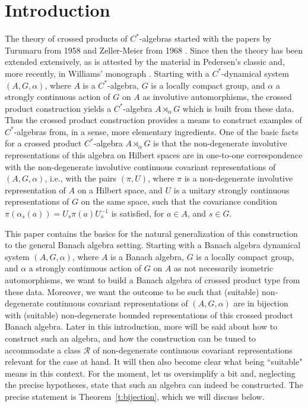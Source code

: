 \documentclass{amsart}
\theoremstyle{plain}
\theoremstyle{definition}
\numberwithin{equation}{section}
\begin{document}
\maketitle

\section{Introduction}\label{sec:intro}

The theory of crossed products of $C^*$-algebras started with the papers by Turumaru \cite{turumaru} from 1958 and Zeller-Meier from 1968 \cite{zeller-meier}. Since then the theory has been extended extensively, as is attested by the material in Pedersen's classic \cite{pedersen} and, more recently, in Williams' monograph \cite{williams}.
Starting with a $C^*$-dynamical system ${(A,G,\alpha)}$, where $A$ is a $C^*$-algebra, $G$ is a locally compact group, and $\alpha$ a strongly continuous action of $G$ on $A$ as involutive automorphisms, the crossed product construction yields a $C^*$-algebra $A{\rtimes}_\alpha G$ which is built from these data. Thus the crossed product construction provides a means to construct examples of $C^*$-algebras from, in a sense, more elementary ingredients.
One of the basic facts for a crossed product $C^*$-algebra $A{\rtimes}_\alpha G$ is that the non-degenerate involutive representations of this algebra on  Hilbert spaces are in one-to-one correspondence with the non-degenerate involutive continuous covariant representations of ${(A,G,\alpha)}$, i.e., with the pairs ${(\pi,U)}$, where $\pi$ is a non-degenerate involutive representation of $A$ on a Hilbert space, and $U$ is a unitary strongly continuous representations of $G$ on the same space, such that the covariance condition $\pi(\alpha_s(a))=U_s\pi(a)U_s^{-1}$ is satisfied, for $a\in A$, and $s\in G$.

This paper contains the basics for the natural generalization of this construction to the general Banach algebra setting. Starting with a Banach algebra dynamical system ${(A,G,\alpha)}$, where $A$ is a Banach algebra, $G$ is a locally compact group, and $\alpha$ a strongly continuous action of $G$ on $A$ as not necessarily isometric automorphisms, we want to build a Banach algebra of crossed product type from these data. Moreover, we want the outcome to be such that (suitable) non-degenerate continuous covariant representations of ${(A,G,\alpha)}$ are in bijection with (suitable) non-degenerate bounded representations of this crossed product Banach algebra. Later in this introduction, more will be said about how to construct such an algebra, and how the construction can be tuned to accommodate a class ${\mathcal R}$ of non-degenerate continuous covariant representations relevant for the case at hand. It will then also become clear what being ``suitable" means in this context. For the moment, let us oversimplify a bit and, neglecting the precise hypotheses, state that such an algebra can indeed be constructed. The precise statement is Theorem~\ref{t:bijection}, which we will discuss below.
\end{document}
